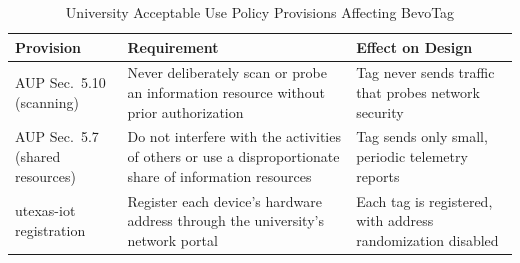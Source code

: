 \documentclass[12pt,letterpaper]{article}
\newenvironment{spectable}{\setstretch{1.0}\renewcommand{\arraystretch}{1.1}}{}
\begin{document}
\begin{table}[H]
\caption{University Acceptable Use Policy Provisions Affecting BevoTag}
\label{tab:aaup}
\centering
\begin{spectable}
\begin{tabularx}{\linewidth}{@{}L{1.7in} Y Y@{}}
\toprule
\textbf{Provision} & \textbf{Requirement} & \textbf{Effect on Design} \\
\midrule
AUP Sec.~5.10 (scanning) \cite{utaup} & Never deliberately scan or probe an information resource without prior authorization & Tag never sends traffic that probes network security \\
AUP Sec.~5.7 (shared resources) \cite{utaup} & Do not interfere with the activities of others or use a disproportionate share of information resources & Tag sends only small, periodic telemetry reports \\
utexas-iot registration \cite{utiot} & Register each device's hardware address through the university's network portal & Each tag is registered, with address randomization disabled \\
\bottomrule
\end{tabularx}
\end{spectable}
\end{table}
\end{document}
